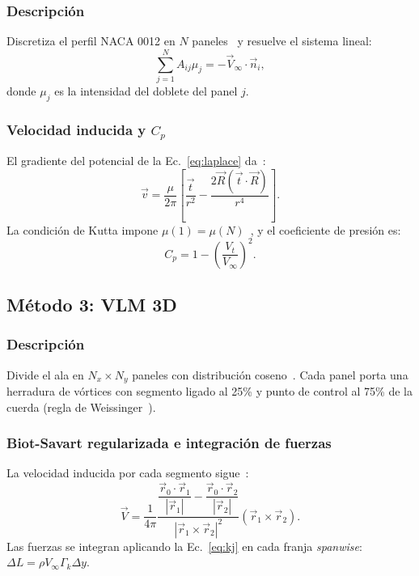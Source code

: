 \documentclass[twocolumn]{article}
\begin{document}
\subsubsection{Descripción}

Discretiza el perfil NACA 0012 en $N$ paneles~\cite{hess1967} y resuelve el sistema lineal:
\begin{equation}
    \sum_{j=1}^{N} A_{ij} \mu_j = -\vec{V}_{\infty} \cdot \vec{n}_i,
    \label{eq:panel_sistema}
\end{equation}
donde $\mu_j$ es la intensidad del doblete del panel $j$.

\subsubsection{Velocidad inducida y $C_p$}

El gradiente del potencial de la Ec.~\eqref{eq:laplace} da~\cite{hess1967}:
\begin{equation}
    \vec{v} = \frac{\mu}{2\pi} \left[ \frac{\vec{t}}{r^2} - \frac{2\vec{R}(\vec{t}\cdot\vec{R})}{r^4} \right].
    \label{eq:doblete}
\end{equation}
La condición de Kutta impone $\mu(1)=\mu(N)$~\cite{katz2001}, y el coeficiente de presión es:
\begin{equation}
    C_p = 1 - \left(\frac{V_t}{V_{\infty}}\right)^2.
    \label{eq:cp}
\end{equation}

\subsection{Método 3: VLM 3D}

\subsubsection{Descripción}

Divide el ala en $N_x \times N_y$ paneles con distribución coseno~\cite{katz2001}. Cada panel porta una herradura de vórtices con segmento ligado al 25\% y punto de control al 75\% de la cuerda (regla de Weissinger~\cite{weissinger1947}).

\subsubsection{Biot-Savart regularizada e integración de fuerzas}

La velocidad inducida por cada segmento sigue~\cite{katz2001}:
\begin{equation}
    \vec{V} = \frac{1}{4\pi} \frac{\dfrac{\vec{r}_0 \cdot \vec{r}_1}{|\vec{r}_1|} - \dfrac{\vec{r}_0 \cdot \vec{r}_2}{|\vec{r}_2|}}{|\vec{r}_1 \times \vec{r}_2|^2} (\vec{r}_1 \times \vec{r}_2).
    \label{eq:biot_savart}
\end{equation}
Las fuerzas se integran aplicando la Ec.~\eqref{eq:kj} en cada franja \textit{spanwise}: $\Delta L = \rho V_{\infty} \Gamma_k \Delta y$.
\end{document}

